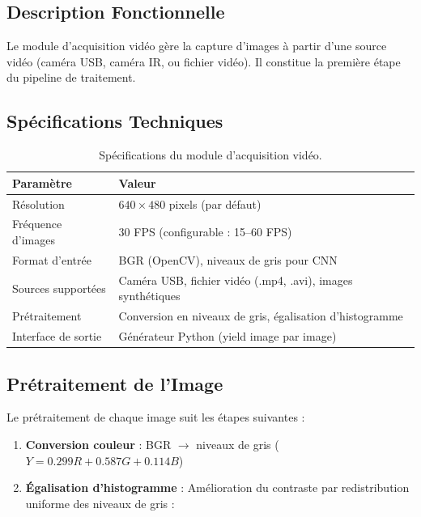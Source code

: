 \documentclass[12pt,a4paper,twoside]{report}
\begin{document}
\subsection{Description Fonctionnelle}

Le module d'acquisition vidéo gère la capture d'images à partir d'une source vidéo (caméra USB, caméra IR, ou fichier vidéo). Il constitue la première étape du pipeline de traitement.

\subsection{Spécifications Techniques}

\begin{table}[H]
\centering
\caption{Spécifications du module d'acquisition vidéo.}
\label{tab:video_specs}
\renewcommand{\arraystretch}{1.3}
\begin{tabular}{|l|l|}
\hline
\rowcolor{stellantisblue!15}
\textbf{Paramètre} & \textbf{Valeur} \\
\hline
Résolution & $640 \times 480$ pixels (par défaut) \\
\hline
Fréquence d'images & 30 FPS (configurable : 15--60 FPS) \\
\hline
Format d'entrée & BGR (OpenCV), niveaux de gris pour CNN \\
\hline
Sources supportées & Caméra USB, fichier vidéo (.mp4, .avi), images synthétiques \\
\hline
Prétraitement & Conversion en niveaux de gris, égalisation d'histogramme \\
\hline
Interface de sortie & Générateur Python (yield image par image) \\
\hline
\end{tabular}
\end{table}

\subsection{Prétraitement de l'Image}

Le prétraitement de chaque image suit les étapes suivantes :

\begin{enumerate}[leftmargin=2cm]
    \item \textbf{Conversion couleur} : BGR $\rightarrow$ niveaux de gris ($Y = 0.299R + 0.587G + 0.114B$)
    \item \textbf{Égalisation d'histogramme} : Amélioration du contraste par redistribution uniforme des niveaux de gris :
\end{enumerate}
\end{document}
